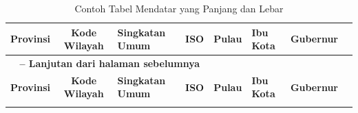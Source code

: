 \begin{landscape}
\scriptsize
\begin{longtable}{p{3.5cm}cllllll}
\caption{Contoh Tabel Mendatar yang Panjang dan Lebar}\\
\hline
\textbf{Provinsi} & \textbf{Kode Wilayah} & \textbf{Singkatan Umum} & \textbf{ISO} & \textbf{Pulau} & \textbf{Ibu Kota} & \textbf{Gubernur} \\ \hline
\endfirsthead

\multicolumn{4}{l}{\bfseries \tablename\ \thetable{} -- Lanjutan dari halaman sebelumnya}\\
\hline
\textbf{Provinsi} & \textbf{Kode Wilayah} & \textbf{Singkatan Umum} & \textbf{ISO} & \textbf{Pulau} & \textbf{Ibu Kota} & \textbf{Gubernur} \\ \hline

\endhead

\hline
\endfoot

\endlastfoot




\end{longtable}
\end{landscape}
